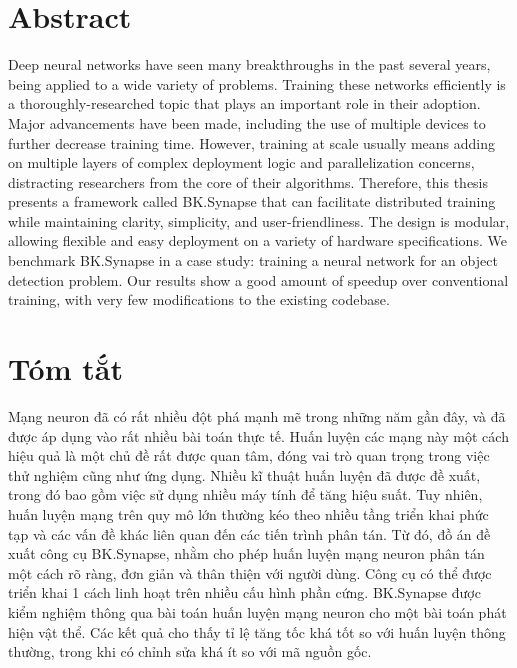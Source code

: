\documentclass[a4paper, 12pt, oneside]{report}
\begin{document}
\chapter*{Abstract}
Deep neural networks have seen many breakthroughs in the past several years, being applied to a wide variety of problems. Training these networks efficiently is a thoroughly-researched topic that plays an important role in their adoption. Major advancements have been made, including the use of multiple devices to further decrease training time. However, training at scale usually means adding on multiple layers of complex deployment logic and parallelization concerns, distracting researchers from the core of their algorithms. Therefore, this thesis presents a framework called BK.Synapse that can facilitate distributed training while maintaining clarity, simplicity, and user-friendliness. The design is modular, allowing flexible and easy deployment on a variety of hardware specifications. We benchmark BK.Synapse in a case study: training a neural network for an object detection problem. Our results show a good amount of speedup over conventional training, with very few modifications to the existing codebase.

\chapter*{Tóm tắt}
Mạng neuron đã có rất nhiều đột phá mạnh mẽ trong những năm gần đây, và đã được áp dụng vào rất nhiều bài toán thực tế. Huấn luyện các mạng này một cách hiệu quả là một chủ đề rất được quan tâm, đóng vai trò quan trọng trong việc thử nghiệm cũng như ứng dụng. Nhiều kĩ thuật huấn luyện đã được đề xuất, trong đó bao gồm việc sử dụng nhiều máy tính để tăng hiệu suất. Tuy nhiên, huấn luyện mạng trên quy mô lớn thường kéo theo nhiều tầng triển khai phức tạp và các vấn đề khác liên quan đến các tiến trình phân tán. Từ đó, đồ án đề xuất công cụ BK.Synapse, nhằm cho phép huấn luyện mạng neuron phân tán một cách rõ ràng, đơn giản và thân thiện với người dùng. Công cụ có thể được triển khai 1 cách linh hoạt trên nhiều cấu hình phần cứng. BK.Synapse được kiểm nghiệm thông qua bài toán huấn luyện mạng neuron cho một bài toán phát hiện vật thể. Các kết quả cho thấy tỉ lệ tăng tốc khá tốt so với huấn luyện thông thường, trong khi có chỉnh sửa khá ít so với mã nguồn gốc.
\end{document}
